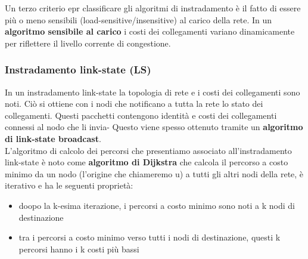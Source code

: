 \documentclass[11pt,a4paper]{article}
\begin{document}
Un terzo criterio epr classificare gli algoritmi di instradamento è il fatto di essere più o meno sensibili (load-sensitive/insensitive) al carico della rete. In un \textbf{algoritmo sensibile al carico} i costi dei collegamenti variano dinamicamente per riflettere il livello corrente di congestione.
\subsubsection{Instradamento link-state (LS)}
In un instradamento link-state la topologia di rete e i costi dei collegamenti sono noti. Ciò si ottiene con i nodi che notificano a tutta la rete lo stato dei collegamenti. Questi pacchetti contengono identità e costi dei collegamenti connessi al nodo che li invia- Questo viene spesso ottenuto tramite un \textbf{algoritmo di link-state broadcast}.\\
L'algoritmo di calcolo dei percorsi che presentiamo associato all'instradamento link-state è noto come \textbf{algoritmo di Dijkstra} che calcola il percorso a costo minimo da un nodo (l'origine che chiameremo u) a tutti gli altri nodi della rete, è iterativo e ha le seguenti proprietà:
\begin{itemize}
	\item doopo la k-esima iterazione, i percorsi a costo minimo sono noti a k nodi di destinazione
	\item tra i percorsi a costo minimo verso tutti i nodi di destinazione, questi k percorsi hanno i k costi più bassi
\end{itemize}
\end{document}
